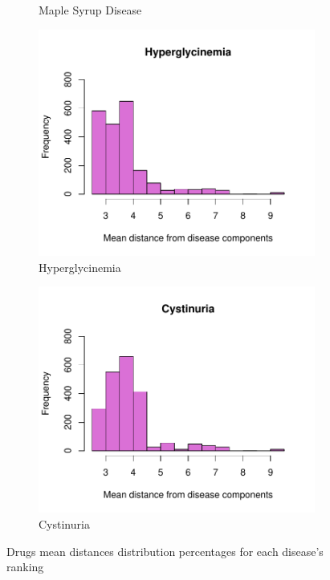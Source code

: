 \begin{figure}[h!]
\begin{subfigure}[b]{0.3\textwidth}
         \caption{Maple Syrup Disease}
         \label{fig:Maple Syrup}
     \end{subfigure}
     \hfill
     \begin{subfigure}[b]{0.3\textwidth}
         \centering
         \includegraphics[scale=0.25]{Images/Hyperglycinemia.pdf}
         \caption{Hyperglycinemia}
         \label{fig:Hyperglycinemia}
     \end{subfigure}
     \hfill
     \begin{subfigure}[b]{0.3\textwidth}
         \centering
         \includegraphics[scale=0.25]{Images/Cystinuria.pdf}
         \caption{Cystinuria}
         \label{fig:Cystinuria}
     \end{subfigure}
     \hfill
    \caption{Drugs mean distances distribution percentages for each disease's ranking}
    \label{fig:results}
\end{figure}
\FloatBarrier